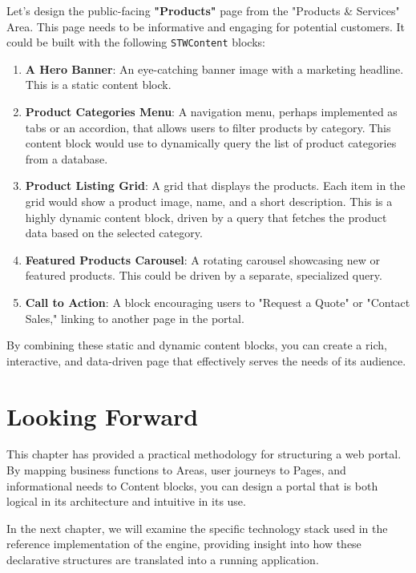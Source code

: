Let's design the public-facing \textbf{"Products"} page from the "Products \& Services" Area. This page needs to be informative and engaging for potential customers. It could be built with the following \texttt{STWContent} blocks:

\begin{enumerate}
    \item \textbf{A Hero Banner}: An eye-catching banner image with a marketing headline. This is a static content block.
    \item \textbf{Product Categories Menu}: A navigation menu, perhaps implemented as tabs or an accordion, that allows users to filter products by category. This content block would use \wbpl{} to dynamically query the list of product categories from a database.
    \item \textbf{Product Listing Grid}: A grid that displays the products. Each item in the grid would show a product image, name, and a short description. This is a highly dynamic content block, driven by a \wbpl{} query that fetches the product data based on the selected category.
    \item \textbf{Featured Products Carousel}: A rotating carousel showcasing new or featured products. This could be driven by a separate, specialized query.
    \item \textbf{Call to Action}: A block encouraging users to "Request a Quote" or "Contact Sales," linking to another page in the portal.
\end{enumerate}

By combining these static and dynamic content blocks, you can create a rich, interactive, and data-driven page that effectively serves the needs of its audience.

\section{Looking Forward}
\label{sec:portal-structure-forward}

This chapter has provided a practical methodology for structuring a web portal. By mapping business functions to Areas, user journeys to Pages, and informational needs to Content blocks, you can design a portal that is both logical in its architecture and intuitive in its use.

In the next chapter, we will examine the specific technology stack used in the reference implementation of the \webspinner{} engine, providing insight into how these declarative structures are translated into a running application.
